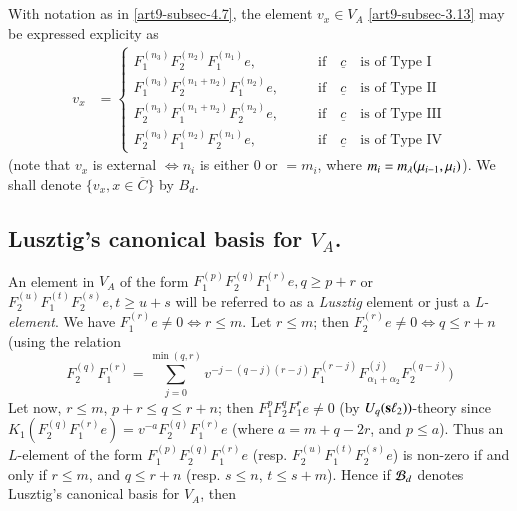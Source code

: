\subsection{}\label{art9-subsec-4.8}
With notation as in \ref{art9-subsec-4.7}, the element $v_{x}\in V_{A}$ \eqref{art9-subsec-3.13} may be expressed explicity as
\begin{align*}
v_{x} &=
\begin{cases}
F_{1}^{(n_{3})} F_{2}^{(n_{2})}F_{1}^{(n_{1})} e,\qquad &\text{if}\quad \underline{c}\quad \text{is of  Type I}\\
F_{1}^{(n_{3})} F_{2}^{(n_{1}+n_{2})}F_{1}^{(n_{2})} e,\qquad &\text{if}\quad \underline{c} \quad\text{is of  Type II}\\
F_{2}^{(n_{3})} F_{1}^{(n_{1}+n_{2})}F_{2}^{(n_{2})} e,\qquad &\text{if}\quad \underline{c}\quad \text{is of  Type III}\\
F_{2}^{(n_{3})} F_{1}^{(n_{2})}F_{2}^{(n_{1})} e,\qquad &\text{if}\quad \underline{c}\quad \text{is of  Type IV}
\end{cases}
\end{align*}
(note that $v_{x}$ is external $\Longleftrightarrow  n_{i}$ is either 0 or $= m_{i}$, where $m_{i}= m_{\lambda}(\mu_{i-1},\break \mu_{i})$). We shall denote $\{v_{x}, x  \in \overline{C}\}$ by $B_{d}$. 

\subsection{Lusztig's canonical basis for $V_{A}$.}\label{art9-subsec-4.9}
An element in $V_{A}$ of the form $F_{1}^{(p)} F_{2}^{(q)}F_{1}^{(r)}e, q\geq p+r$ or $F_{2}^{(u)} F_{1}^{(t)}F_{2}^{(s)} e, t\geq u + s$ will be referred to as a \textit{Lusztig} element or just a \textit{L-element}. We have $F_{1}^{(r)} e \neq 0 \Longleftrightarrow r \leq m$. Let $r \leq m$; then $F_{2}^{(r)} e \neq 0 \Longleftrightarrow q \leq r + n$ (using the relation
$$
F_{2}^{(q)}F_{1}^{(r)} = \sum\limits_{j=0}^{\min(q,r)} v^{-j-(q-j)(r-j)}F_{1}^{(r-j)}F_{\alpha_{1}+ \alpha_{2}}^{(j)} F_{2}^{(q-j)})
$$
Let now, $r \leq m$, $p+r \leq q \leq r +n$; then $F_{1}^{p} F_{2}^{q}F_{1}^{r} e \neq 0$ (by $U_{q}(\mathbf{s}\ell_{2}))$-theory since $K_{1}(F_{2}^{(q)}F_{1}^{(r)}e) = v^{-a}F_{2}^{(q)}F_{1}^{(r)} e$ (where $a=m+q-2r$, and $ p\leq a$). Thus an $L$-element of the form $F_{1}^{(p)}F_{2}^{(q)}F_{1}^{(r)}e$ (resp. $F_{2}^{(u)}F_{1}^{(t)}F_{2}^{(s)}e$) is non-zero if and only if $r\leq m$, and $q \leq r+n$ (resp. $s \leq n$, $t \leq s+m$). Hence if $\mathcal{B}_{d}$ denotes Lusztig's canonical basis for $V_{A}$, then

